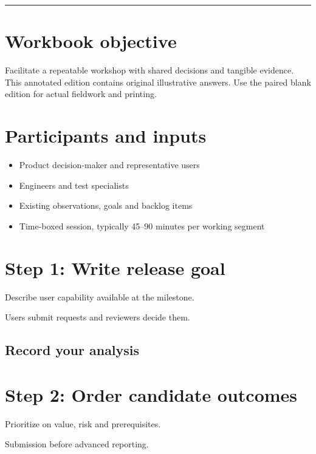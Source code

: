 \documentclass[11pt,letterpaper]{article}
\begin{document}
\tableofcontents\medskip\noindent\rule{\linewidth}{0.4pt}\medskip
\section{Workbook objective}
Facilitate a repeatable workshop with shared decisions and tangible evidence. This annotated edition contains original illustrative answers. Use the paired blank edition for actual fieldwork and printing.

\section{Participants and inputs}
\begin{itemize}[leftmargin=*,itemsep=2pt]
\item Product decision-maker and representative users
\item Engineers and test specialists
\item Existing observations, goals and backlog items
\item Time-boxed session, typically 45–90 minutes per working segment
\end{itemize}
\section{Step 1: Write release goal}
Describe user capability available at the milestone.

\begin{tcolorbox}[colback=tealback,colframe=navy,title={Illustration},breakable]
Users submit requests and reviewers decide them.

\end{tcolorbox}
\subsection{Record your analysis}
\section{Step 2: Order candidate outcomes}
Prioritize on value, risk and prerequisites.

\begin{tcolorbox}[colback=tealback,colframe=navy,title={Illustration},breakable]
Submission before advanced reporting.

\end{tcolorbox}
\end{document}
